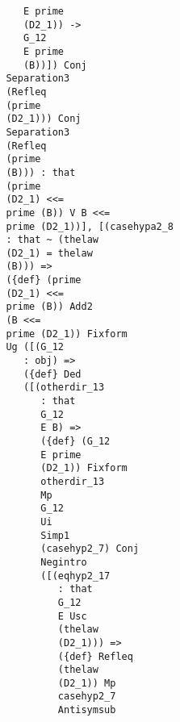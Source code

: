 \documentclass[12pt]{article}
\begin{document}
\begin{verbatim}
                                     E prime 
                                     (D2_1)) -> 
                                     G_12 
                                     E prime 
                                     (B))]) Conj 
                                  Separation3 
                                  (Refleq 
                                  (prime 
                                  (D2_1))) Conj 
                                  Separation3 
                                  (Refleq 
                                  (prime 
                                  (B))) : that 
                                  (prime 
                                  (D2_1) <<= 
                                  prime (B)) V B <<= 
                                  prime (D2_1))], [(casehypa2_8 
                                  : that ~ (thelaw 
                                  (D2_1) = thelaw 
                                  (B))) => 
                                  ({def} (prime 
                                  (D2_1) <<= 
                                  prime (B)) Add2 
                                  (B <<= 
                                  prime (D2_1)) Fixform 
                                  Ug ([(G_12 
                                     : obj) => 
                                     ({def} Ded 
                                     ([(otherdir_13 
                                        : that 
                                        G_12 
                                        E B) => 
                                        ({def} (G_12 
                                        E prime 
                                        (D2_1)) Fixform 
                                        otherdir_13 
                                        Mp 
                                        G_12 
                                        Ui 
                                        Simp1 
                                        (casehyp2_7) Conj 
                                        Negintro 
                                        ([(eqhyp2_17 
                                           : that 
                                           G_12 
                                           E Usc 
                                           (thelaw 
                                           (D2_1))) => 
                                           ({def} Refleq 
                                           (thelaw 
                                           (D2_1)) Mp 
                                           casehyp2_7 
                                           Antisymsub 

\end{verbatim}
\end{document}
